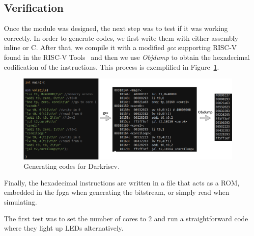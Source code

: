 \subsection{Verification}
Once the module was designed, the next step was to test if it was working correctly.
In order to generate codes, we first write them with either assembly inline or C.
After that, we compile it with a modified \textit{gcc} supporting RISC-V found in the RISC-V Tools~\cite{tools} and then we use \textit{Objdump} to obtain the hexadecimal codification of the instructions.
This process is exemplified in Figure~\ref{coding}.

\begin{figure}[h!]
    \centering
    \includegraphics[width=.9\textwidth]{images/coding.png}
    \caption{Generating codes for Darkriscv.}
    \label{coding}
\end{figure}

Finally, the hexadecimal instructions are written in a file that acts as a ROM, embedded in the \gls{fpga} when generating the bitstream, or simply read when simulating.

The first test was to set the number of cores to 2 and run a straightforward code where they light up LEDs alternatively.



